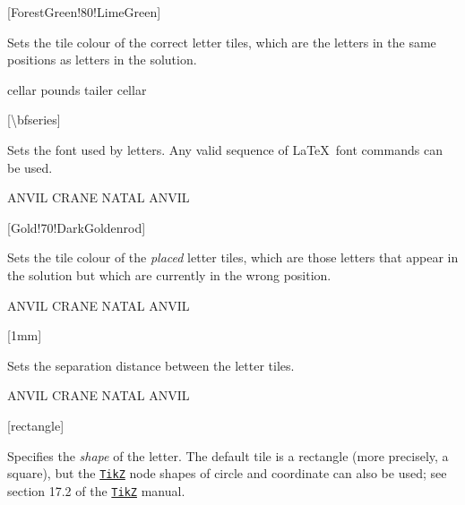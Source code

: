\documentclass[svgnames]{report}
\newcommand\ctan[1]{\href{https://www.ctan.org/pkg/#1}{\texttt{#1}}}
\begin{document}
  [ForestGreen!80!LimeGreen]

  Sets the tile colour of the correct  letter tiles,
  which are the letters in the same positions as letters in the solution.

  \begin{example}
    \begin{wordle}[correct=LightSkyBlue]{cellar}
      pounds
      tailer
      cellar
    \end{wordle}
  \end{example}

  [\textbackslash bfseries]

  Sets the font used by  letters. Any valid sequence of
  \LaTeX\ font commands can be used.

  \begin{example}
    \begin{wordle}[font=\large\sffamily]{ANVIL}
      CRANE
      NATAL
      ANVIL
    \end{wordle}
  \end{example}

  [Gold!70!DarkGoldenrod]

  Sets the tile colour of the \textit{placed}  letter tiles,
  which are those letters that appear in the solution but which are
  currently in the wrong position.

  \begin{example}
    \begin{wordle}[placed=Orange]{ANVIL}
      CRANE
      NATAL
      ANVIL
    \end{wordle}
  \end{example}

  [1mm]

  Sets the separation distance between the  letter
  tiles.

  \begin{example}
    \begin{wordle}[separation=2mm]{ANVIL}
      CRANE
      NATAL
      ANVIL
    \end{wordle}
  \end{example}

  [rectangle]

  Specifies the \textit{shape} of the  letter. The default tile
   is a \textsf{rectangle} (more precisely, a square), but the
  \ctan{TikZ} node shapes of \textsf{circle} and \textsf{coordinate} can
  also be used; see section 17.2 of the \ctan{TikZ} manual.
\end{document}

